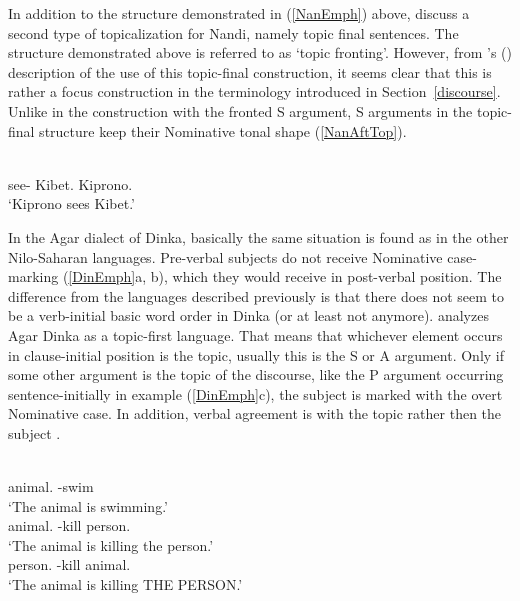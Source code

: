 In addition to the structure demonstrated in (\ref{NanEmph}) above, \citet[124--125]{Creider:1989} discuss a second type of topicalization for Nandi, namely topic final sentences. 
The structure demonstrated above is referred to as `topic fronting'. 
However, from \citeauthor{Creider:1989}'s (\citeyear[150]{Creider:1989}) description of the use of this topic-final construction, it seems clear that this is rather a focus construction in the terminology introduced in Section~\ref{discourse}.
Unlike in the construction with the fronted S argument, S arguments in the topic-final structure keep their Nominative tonal shape (\ref{NanAftTop}).


\begin{exe}\ex\label{NanAftTop}
\gll{}  \\
see-\ipfv{} Kibet.\acc{} Kiprono.\nom{}\\
\glt `Kiprono sees  Kibet.'
\end{exe}

In the Agar dialect of Dinka, basically the same situation  is found as in the other Nilo-Saharan languages. 
Pre-verbal subjects do not receive Nominative case-marking (\ref{DinEmph}a, b), which they would receive in post-verbal position. 
The difference from the languages described previously is that there does not seem to be a verb-initial basic word order in Dinka (or at least not anymore).  
\citet{Andersen:1991} analyzes Agar Dinka as a topic-first language. 
That means that whichever element occurs in clause-initial position is the topic, usually this is the S or A argument. 
Only if some other argument is the topic of the discourse, like the P argument occurring sentence-initially in example (\ref{DinEmph}c), the subject is marked with the overt Nominative case. 
In addition, verbal agreement is with the topic rather then the subject \citep{Andersen:1991}. 

\begin{exe}\ex\label{DinEmph}
\begin{xlist} 
\ex\gll {} \\
animal.\acc{} \decl{}-swim\\
\glt `The animal is swimming.'
\ex\gll {}  \\
animal.\acc{} \decl{}-kill person.\acc{}\\
\glt `The animal is killing the person.'
\ex\gll {}  \\
person.\acc{} \decl{}-kill animal.\nom{}\\
\glt `The animal is killing THE PERSON.' 
\end{xlist}
\end{exe}

